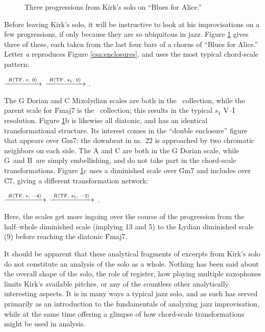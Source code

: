 \begin{figure}[tbp]
  \caption{Three \tfo progressions from Kirk's solo on ``Blues for Alice.''}
  \label{csa:kirk-tfo-progs}
\end{figure}

Before leaving Kirk's solo, it will be instructive to look at his
improvisations on a few \tfo progressions, if only because they are so
ubiquitous in jazz. Figure \ref{csa:kirk-tfo-progs} gives three of these, each
taken from the last four bars of a chorus of ``Blues for Alice.'' 
Letter \emph{a} reproduces Figure \ref{csa:enclosures},
and uses the most typical \tfo chord-scale pattern: \\
{\centering {}
  $\xrightarrow{\text{ \mbox{\ensuremath{R\langle}TF, $e$, $0$\ensuremath{\rangle}} }}$ 
  $\xrightarrow{\text{ \mbox{\ensuremath{R\langle}TF, $s_1$, $0$\ensuremath{\rangle}} }}$ . \par
}
\noindent The G Dorian and C Mixolydian scales are both in the \flat\
collection, while the parent scale for \h{Fmaj7} is the \nat\ collection; this
results in the typical $s_1$ V--I resolution.\fn{csa-11} Figure
\ref{csa:kirk-tfo-progs}b is likewise all diatonic, and has an identical
transformational structure. Its interest comes in the ``double enclosure'' figure
that appears over \h{Gm7}: the downbeat \Bflat in m.~22 is approached by two chromatic
neighbors on each side. The A and C are both in the G Dorian scale, while
G\sharp\ and B\nat\ are simply embellishing, and do not take part in the
chord-scale transformations. Figure \ref{csa:kirk-tfo-progs}c uses a
diminished scale over \h{Gm7} and
includes \Dflat over \h{C7}, giving a different transformation network: \\
{\centering \cst{Gm7}{\flat}{HW dim.}
  $\xrightarrow{\text{ \mbox{\ensuremath{R\langle}TF, $e$, $-4$\ensuremath{\rangle}} }}$ 
  $\xrightarrow{\text{ \mbox{\ensuremath{R\langle}TF, $s_1$, $-2$\ensuremath{\rangle}} }}$
  . \par
}
\noindent Here, the scales get more ingoing over the course of the progression
from the half--whole diminished scale (implying \flat{}13 and \flat{}5) to the
Lydian diminished scale (\flat{}9) before reaching the diatonic \h{Fmaj7}.

It should be apparent that these analytical fragments of excerpts from Kirk's
solo do not constitute an analysis of the solo as a whole. Nothing has been
said about the overall shape of the solo, the role of register, how playing
multiple saxophones limits Kirk's available pitches, or any of the countless
other analytically interesting aspects. It is in many ways a typical jazz
solo, and as such has served primarily as an introduction to the fundamentals
of analyzing jazz improvisation, while at the same time offering a glimpse of
how chord-scale transformations might be used in analysis.


